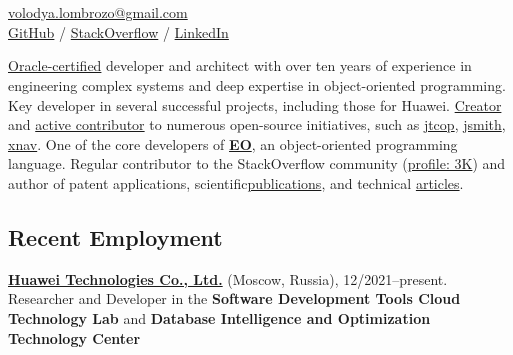\documentclass{vl}
\begin{document}
    \vlPrintPhoto{}

    \section*{\Large {}}

    \href{mailto:volodya.lombrozo@gmail.com}{volodya.lombrozo@gmail.com}\\%
    \href{https://github.com/volodya-lombrozo}{GitHub} /
    \href{https://stackoverflow.com/users/10423604/volodya-lombrozo}{StackOverflow} /
    \href{https://www.linkedin.com/in/vladimir-zakharov-lombrozo-b71744216/}{LinkedIn}

    \vspace*{12pt}

    \href{https://catalog-education.oracle.com/pls/certview/sharebadge?id=87F6A2FE819A5A5AF4120A05900AB28A461EE9A3EE9FBFA02721FADAEB3BCE19}{Oracle-certified}
    developer and architect with over ten years of experience in engineering complex systems
    and deep expertise in object-oriented programming.
    Key developer in several successful projects, including those for Huawei.
    \href{https://github.com/volodya-lombrozo?tab=repositories}{Creator} and
    \href{https://github.com/volodya-lombrozo}{active contributor} to numerous open-source initiatives, such as
    \href{https://github.com/volodya-lombrozo/jtcop}{jtcop},
    \href{https://github.com/volodya-lombrozo/jsmith}{jsmith},
    \href{https://github.com/volodya-lombrozo/xnav}{xnav}.
    One of the core developers of \textbf{\href{https://www.eolang.org}{EO}}, an object-oriented programming language.
    Regular contributor to the StackOverflow community
    (\href{https://stackoverflow.com/users/10423604/volodya-lombrozo}{profile: 3K}) and
    author of patent applications, scientific\href{https://arxiv.org/abs/2410.05631}{publications}, and technical
    \href{https://dzone.com/users/4993224/volodya-lombrozo.html}{articles}.

    \subsection*{Recent Employment}

    \textbf{\href{https://www.huawei.com}{Huawei Technologies Co., Ltd.}} (Moscow, Russia), 12/2021--present.
    Researcher and Developer in the \textbf{Software Development Tools Cloud Technology Lab} and
    \textbf{Database Intelligence and Optimization Technology Center}
\end{document}
